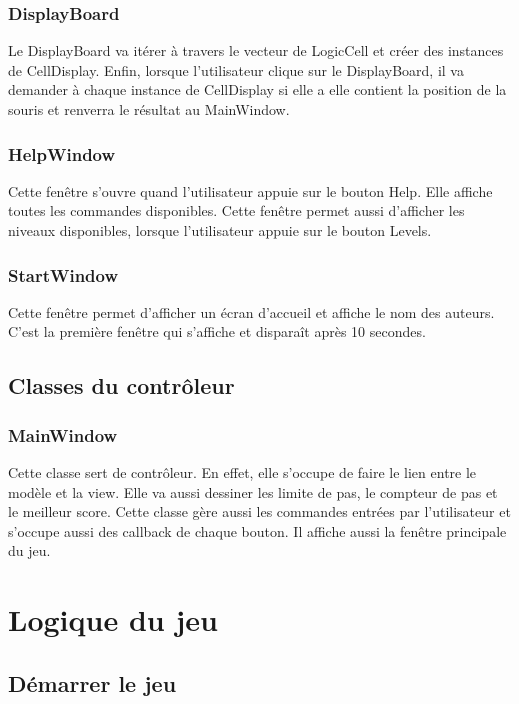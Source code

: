 \documentclass[utf8]{article}
\begin{document}
\begin{large}
\subsubsection{DisplayBoard}
\indent
\par
Le DisplayBoard va itérer à travers le vecteur de LogicCell et créer des
instances de CellDisplay. Enfin, lorsque l'utilisateur clique sur le
DisplayBoard, il va demander à chaque instance de CellDisplay si elle a elle
contient la position de la souris et renverra le résultat au MainWindow.
\par
\subsubsection{HelpWindow}
\indent
\par
Cette fenêtre s'ouvre quand l'utilisateur appuie sur le bouton Help. Elle
affiche toutes les commandes disponibles. Cette fenêtre permet aussi d'afficher
les niveaux disponibles, lorsque l'utilisateur appuie sur le bouton Levels.
\par
\subsubsection{StartWindow}
\indent
\par
Cette fenêtre permet d'afficher un écran d'accueil et affiche le nom des
auteurs. C'est la première fenêtre qui s'affiche et disparaît après 10 secondes.
\par

\subsection{Classes du contrôleur}
\subsubsection{MainWindow}
\indent
\par
Cette classe sert de contrôleur. En effet, elle s'occupe de faire le lien entre
le modèle et la view. Elle va aussi dessiner les limite de pas, le compteur de
pas et le meilleur score. Cette classe gère aussi les commandes entrées par
l'utilisateur et s'occupe aussi des callback de chaque bouton. Il affiche aussi
la fenêtre principale du jeu.
\par
\section{Logique du jeu}
\subsection{Démarrer le jeu}
\indent
\par


\end{large}
\end{document}
